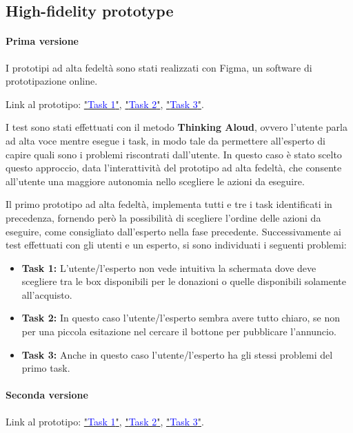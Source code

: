\documentclass{article}
\begin{document}
\subsection{High-fidelity prototype}

\paragraph{Prima versione}
\mbox{}
\newline
I prototipi ad alta fedeltà sono stati realizzati con Figma, un software di prototipazione online.

Link al prototipo: \href{https://www.figma.com/proto/xET26iTanAxBERu0jhT0FS/Task?node-id=0-1&t=yNOGB0vveNBLslKN-1}{"\textcolor{blue}{Task 1}"}, \href{https://www.figma.com/design/xET26iTanAxBERu0jhT0FS/Task?node-id=31-38&t=yNOGB0vveNBLslKN-1}{"\textcolor{blue}{Task 2}"}, \href{https://www.figma.com/proto/xET26iTanAxBERu0jhT0FS/Task?node-id=74-42&t=yNOGB0vveNBLslKN-1}{"\textcolor{blue}{Task 3}"}.

I test sono stati effettuati con il metodo \textbf{Thinking Aloud}, ovvero l'utente parla ad alta voce mentre esegue i task, in modo tale da permettere all'esperto di capire quali sono i problemi riscontrati dall'utente.
In questo caso è stato scelto questo approccio, data l'interattività del prototipo ad alta fedeltà, che consente all'utente una maggiore autonomia nello scegliere le azioni da eseguire.

Il primo prototipo ad alta fedeltà, implementa tutti e tre i task identificati in precedenza, fornendo però la possibilità di scegliere l'ordine delle azioni da eseguire, come consigliato dall'esperto nella fase precedente.
Successivamente ai test effettuati con gli utenti e un esperto, si sono individuati i seguenti problemi:
\begin{itemize}
    \item \textbf{Task 1:} L'utente/l'esperto non vede intuitiva la schermata dove deve scegliere tra le box disponibili per le donazioni o quelle disponibili solamente all'acquisto.
    \item \textbf{Task 2:} In questo caso l'utente/l'esperto sembra avere tutto chiaro, se non per una piccola esitazione nel cercare il bottone per pubblicare l'annuncio.
    \item \textbf{Task 3:} Anche in questo caso l'utente/l'esperto ha gli stessi problemi del primo task.
\end{itemize}

\paragraph{Seconda versione}
\mbox{}
\newline
Link al prototipo: \href{https://www.figma.com/proto/xET26iTanAxBERu0jhT0FS/Task?node-id=0-1&t=yNOGB0vveNBLslKN-1}{"\textcolor{blue}{Task 1}"}, \href{https://www.figma.com/design/xET26iTanAxBERu0jhT0FS/Task?node-id=31-38&t=yNOGB0vveNBLslKN-1}{"\textcolor{blue}{Task 2}"}, \href{https://www.figma.com/proto/xET26iTanAxBERu0jhT0FS/Task?node-id=74-42&t=yNOGB0vveNBLslKN-1}{"\textcolor{blue}{Task 3}"}.
\end{document}
